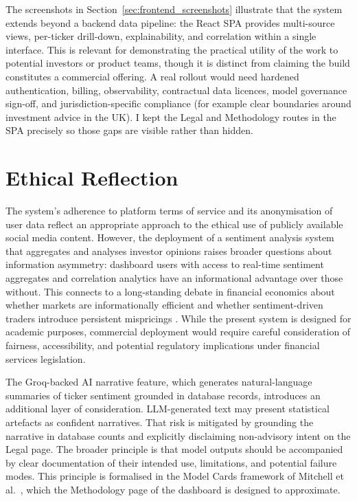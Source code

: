The screenshots in Section~\ref{sec:frontend_screenshots} illustrate that the system extends beyond a backend data pipeline: the React SPA provides multi-source views, per-ticker drill-down, explainability, and correlation within a single interface. This is relevant for demonstrating the practical utility of the work to potential investors or product teams, though it is distinct from claiming the build constitutes a commercial offering. A real rollout would need hardened authentication, billing, observability, contractual data licences, model governance sign-off, and jurisdiction-specific compliance (for example clear boundaries around investment advice in the UK). I kept the Legal and Methodology routes in the SPA precisely so those gaps are visible rather than hidden.

\section{Ethical Reflection}

The system's adherence to platform terms of service and its anonymisation of user data reflect an appropriate approach to the ethical use of publicly available social media content.  However, the deployment of a sentiment analysis system that aggregates and analyses investor opinions raises broader questions about information asymmetry: dashboard users with access to real-time sentiment aggregates and correlation analytics have an informational advantage over those without.  This connects to a long-standing debate in financial economics about whether markets are informationally efficient \citep{fama1970efficient} and whether sentiment-driven traders introduce persistent mispricings \citep{delong1990noise, barberis2003behavioral}.  While the present system is designed for academic purposes, commercial deployment would require careful consideration of fairness, accessibility, and potential regulatory implications under financial services legislation.

The Groq-backed AI narrative feature, which generates natural-language summaries of ticker sentiment grounded in database records, introduces an additional layer of consideration. LLM-generated text may present statistical artefacts as confident narratives. That risk is mitigated by grounding the narrative in database counts and explicitly disclaiming non-advisory intent on the Legal page.  The broader principle is that model outputs should be accompanied by clear documentation of their intended use, limitations, and potential failure modes. This principle is formalised in the Model Cards framework of Mitchell et al.\ \citep{mitchell2019modelcards}, which the Methodology page of the dashboard is designed to approximate.
